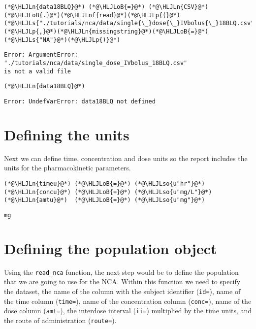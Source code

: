 \documentclass[12pt,a4paper]{article}
\newcommand{\HLJLn}[1]{#1}
\newcommand{\HLJLnf}[1]{\textcolor[RGB]{66,102,213}{#1}}
\newcommand{\HLJLs}[1]{\textcolor[RGB]{201,61,57}{#1}}
\newcommand{\HLJLso}[1]{\textcolor[RGB]{201,61,57}{#1}}
\newcommand{\HLJLoB}[1]{\textcolor[RGB]{102,102,102}{\textbf{#1}}}
\newcommand{\HLJLp}[1]{#1}
\begin{document}
\begin{lstlisting}
(*@\HLJLn{data18BLQ}@*) (*@\HLJLoB{=}@*) (*@\HLJLn{CSV}@*)(*@\HLJLoB{.}@*)(*@\HLJLnf{read}@*)(*@\HLJLp{(}@*)(*@\HLJLs{"./tutorials/nca/data/single{\_}dose{\_}IVbolus{\_}18BLQ.csv"}@*)(*@\HLJLp{,}@*)(*@\HLJLn{missingstring}@*)(*@\HLJLoB{=}@*)(*@\HLJLs{"NA"}@*)(*@\HLJLp{)}@*)
\end{lstlisting}

\begin{lstlisting}
Error: ArgumentError: "./tutorials/nca/data/single_dose_IVbolus_18BLQ.csv" 
is not a valid file
\end{lstlisting}


\begin{lstlisting}
(*@\HLJLn{data18BLQ}@*)
\end{lstlisting}

\begin{lstlisting}
Error: UndefVarError: data18BLQ not defined
\end{lstlisting}


\section{Defining the units}
Next we can define time, concentration and dose units so the report includes the units for the pharmacokinetic parameters.


\begin{lstlisting}
(*@\HLJLn{timeu}@*) (*@\HLJLoB{=}@*) (*@\HLJLso{u"hr"}@*)
(*@\HLJLn{concu}@*) (*@\HLJLoB{=}@*) (*@\HLJLso{u"mg/L"}@*)
(*@\HLJLn{amtu}@*)  (*@\HLJLoB{=}@*) (*@\HLJLso{u"mg"}@*)
\end{lstlisting}

\begin{lstlisting}
mg
\end{lstlisting}


\section{Defining the population object}
Using the \texttt{read\_nca} function, the next step would be to define the population that we are going to use for the NCA. Within this function we need to specify the dataset, the name of the column with the subject identifier (\texttt{id=}), name of the time column (\texttt{time=}), name of the concentration column (\texttt{conc=}), name of the dose column (\texttt{amt=}), the interdose interval (\texttt{ii=}) multiplied by the time units, and the route of administration (\texttt{route=}).
\end{document}
